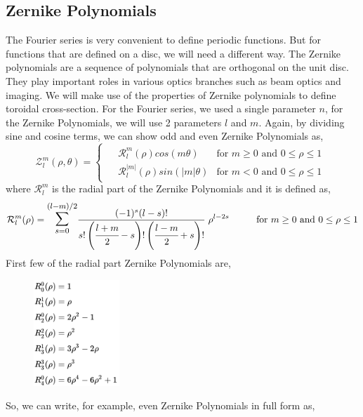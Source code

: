 \subsection{Zernike Polynomials}

The Fourier series is very convenient to define periodic functions. But for functions that are defined on a disc, we will need a different way. The Zernike polynomials are a sequence of polynomials that are orthogonal on the unit disc. They play important roles in various optics branches such as beam optics and imaging. We will make use of the properties of Zernike polynomials to define toroidal cross-section. For the Fourier series, we used a single parameter $n$, for the Zernike Polynomials, we will use 2 parameters $l$ and $m$. Again, by dividing sine and cosine terms, we can show odd and even Zernike Polynomials as,
\begin{equation}
    \mathcal{Z}_l^m(\rho,\theta) = \begin{cases}\begin{aligned}
            &\mathcal{R}_l^{m}(\rho) cos(m\theta) & \text{for } m\geq 0 \text{ and } 0\leq\rho\leq 1 \\[.3cm]
            &\mathcal{R}_l^{|m|}(\rho) sin(|m|\theta) & \text{for } m < 0  \text{ and } 0\leq\rho\leq 1
        \end{aligned}
    \end{cases}
    \label{zernike-poly}
\end{equation}
where $\mathcal{R}_l^m$ is the radial part of the Zernike Polynomials and it is defined as,
\begin{equation}
    \mathcal{R}_l^{m} (\rho) = \mathlarger{\mathlarger{\sum}}_{s=0}^{(l-m)/2} \frac{(-1)^s(l-s)!}{ s!\left( \cfrac{l+m}{2} - s\right)! \left( \cfrac{l-m}{2} + s\right)!  }\hspace{0.1cm} \rho^{l-2s} \hspace{1cm}\text{for } m\geq0  \text{ and } 0\leq\rho\leq 1
\end{equation}
First few of the radial part Zernike Polynomials are,
\begin{figure}[H]
    \centering
    \includegraphics[height=4cm]{figures/zernike-poly.png}
\end{figure}
So, we can write, for example, even Zernike Polynomials in full form as,

